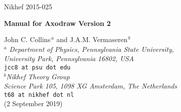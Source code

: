\documentclass[12pt]{article}
\def\program#1{\texttt{#1}}
\begin{document}



\setcounter{page}{0}
\thispagestyle{empty}
\hfill \begin{minipage}{3.0cm}
Nikhef 2015-025
\end{minipage}
\vspace{20mm}

\begin{center}
{\LARGE\bf\sc Manual for Axodraw Version 2}
\end{center}
\vspace{5mm}
\begin{center}
{\large John C. Collins$^{\, a}$ and J.A.M. Vermaseren$^{\, b}$} 
\vspace{1cm}\\
{\it $^a$ Department of Physics, Pennsylvania State University, \\
\vspace{0.1cm}
University Park, Pennsylvania 16802, USA} \\
\texttt{jcc8 at psu dot edu} \\
\vspace{0.5cm}
{\it $^b$Nikhef Theory Group \\
\vspace{0.1cm}
Science Park 105, 1098 XG Amsterdam, The Netherlands} \\
\texttt{t68 at nikhef dot nl} \\
\vspace{1.0cm}
(2 September 2019)
\end{center}
\vspace{5mm}

\begin{abstract}
This is the reference manual for version two of the \LaTeX{} graphical
style file Axodraw.  
Relative to version one,
it has a number of new drawing primitives and many extra options, and 
it can now work with \program{pdflatex} to directly produce
output in PDF file format (but with the aid of an auxiliary program).
\end{abstract}
\end{document}
